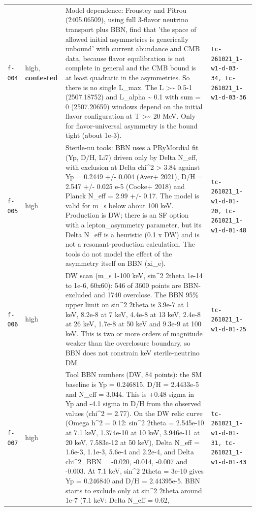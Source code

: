 \documentclass[11pt,a4paper]{article}
\begin{document}
\begin{longtable}{@{}p{}p{}p{}p{}@{}}
\texttt{f-004} & high, \textbf{contested} & Model dependence: Froustey and Pitrou (2405.06509), using full 3-flavor neutrino transport plus BBN, find that 'the space of allowed initial asymmetries is generically unbound' with current abundance and CMB data, because flavor equilibration is not complete in general and the CMB bound is at least quadratic in the asymmetries. So there is no single L\_max. The L \textgreater{}\textasciitilde{} 0.5-1 (2507.18752) and \textbar{}L\_alpha\textbar{} \textasciitilde{} 0.1 with sum = 0 (2507.20659) windows depend on the initial flavor configuration at T \textgreater{}\textasciitilde{} 20 MeV. Only for flavor-universal asymmetry is the bound tight (about 1e-3). & \texttt{tc-261021\_\allowbreak{}1-w1-d-03-34,\allowbreak{} tc-261021\_\allowbreak{}1-w1-d-03-36} \\
\texttt{f-005} & high & Sterile-nu tools: BBN uses a PRyMordial fit (Yp, D/H, Li7) driven only by Delta N\_eff, with exclusion at Delta chi\textasciicircum{}2 \textgreater{} 3.84 against Yp = 0.2449 +/- 0.004 (Aver+ 2021), D/H = 2.547 +/- 0.025 e-5 (Cooke+ 2018) and Planck N\_eff = 2.99 +/- 0.17. The model is valid for m\_s below about 100 keV. Production is DW; there is an SF option with a lepton\_asymmetry parameter, but its Delta N\_eff is a heuristic (0.1 x DW) and is not a resonant-production calculation. The tools do not model the effect of the asymmetry itself on BBN (xi\_e). & \texttt{tc-261021\_\allowbreak{}1-w1-d-01-20,\allowbreak{} tc-261021\_\allowbreak{}1-w1-d-01-48} \\
\texttt{f-006} & high & DW scan (m\_s 1-100 keV, sin\textasciicircum{}2 2theta 1e-14 to 1e-6, 60x60): 546 of 3600 points are BBN-excluded and 1740 overclose. The BBN 95\% upper limit on sin\textasciicircum{}2 2theta is 3.9e-7 at 1 keV, 8.2e-8 at 7 keV, 4.4e-8 at 13 keV, 2.4e-8 at 26 keV, 1.7e-8 at 50 keV and 9.3e-9 at 100 keV. This is two or more orders of magnitude weaker than the overclosure boundary, so BBN does not constrain keV sterile-neutrino DM. & \texttt{tc-261021\_\allowbreak{}1-w1-d-01-25} \\
\texttt{f-007} & high & Tool BBN numbers (DW, 84 points): the SM baseline is Yp = 0.246815, D/H = 2.4433e-5 and N\_eff = 3.044. This is +0.48 sigma in Yp and -4.1 sigma in D/H from the observed values (chi\textasciicircum{}2 = 2.77). On the DW relic curve (Omega h\textasciicircum{}2 = 0.12: sin\textasciicircum{}2 2theta = 2.545e-10 at 7.1 keV, 1.374e-10 at 10 keV, 3.946e-11 at 20 keV, 7.583e-12 at 50 keV), Delta N\_eff = 1.6e-3, 1.1e-3, 5.6e-4 and 2.2e-4, and Delta chi\textasciicircum{}2\_BBN = -0.020, -0.014, -0.007 and -0.003. At 7.1 keV, sin\textasciicircum{}2 2theta = 3e-10 gives Yp = 0.246840 and D/H = 2.44395e-5. BBN starts to exclude only at sin\textasciicircum{}2 2theta around 1e-7 (7.1 keV: Delta N\_eff = 0.62,  & \texttt{tc-261021\_\allowbreak{}1-w1-d-01-31,\allowbreak{} tc-261021\_\allowbreak{}1-w1-d-01-43} \\

\end{longtable}
\end{document}
